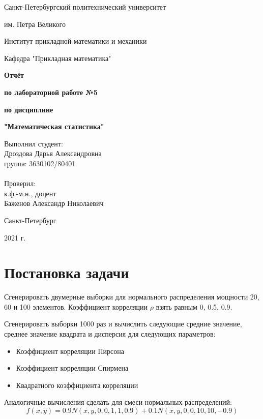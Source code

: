 \documentclass{article}
\begin{document}
\begin{titlepage}
  \centerline {Санкт-Петербургский политехнический университет}
  \centerline { им. Петра Великого}
  \centerline { }
  \centerline {Институт прикладной математики и механики} 
  \centerline {Кафедра "Прикладная математика"}
  \vfill
  \centerline{\textbf{Отчёт}}
  \centerline{\textbf{по лабораторной работе №5}}
  \centerline{\textbf{по дисциплине}}
  \centerline{\textbf{"Математическая статистика"}}
  \vfill
  \hfill
  \begin{minipage}{0.45\textwidth}
  Выполнил студент:\\
  Дроздова Дарья Александровна\\
  группа: 3630102/80401 \\
  \\
  Проверил:\\
  к.ф.-м.н., доцент \\
  Баженов Александр Николаевич
  \end{minipage}
  \vfill
  \centerline {Санкт-Петербург}   
  \centerline {2021 г.}  
\end{titlepage}

\newpage
\setcounter{page}{2}
\tableofcontents

\newpage
\listoffigures

\newpage
\listoftables

\newpage
\section{Постановка задачи}

Сгенерировать двумерные выборки для нормального распределения мощности 20, 60 и 100 элементов. Коэффициент корреляции $\rho$ взять равным 0, 0.5, 0.9.

Сгенерировать выборки 1000 раз и вычислить следующие средние значение, среднее значение квадрата и дисперсия для следующих параметров:
\begin{itemize}
	\item Коэффициент корреляции Пирсона
	\item Коэффициент корреляции Спирмена
	\item Квадратного коэффициента корреляции
\end{itemize}

Аналогичные вычисления сделать для смеси нормальных распределений:
\begin{equation}
f(x,y) = 0.9 N(x,y,0,0,1,1,0.9) + 0.1 N(x,y,0,0,10,10,-0.9)
\label{eq:1}
\end{equation}
\end{document}
